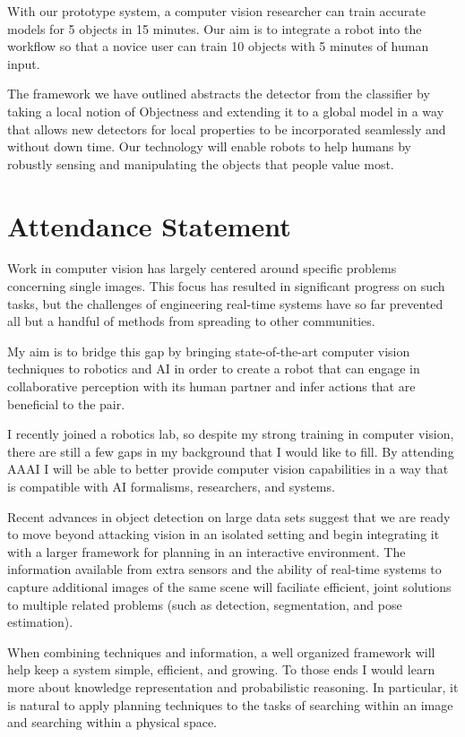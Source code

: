 \documentclass[12pt]{article}
\numberwithin{equation}{section}
\numberwithin{table}{section}
\numberwithin{figure}{section}
\begin{document}
With our prototype system, a computer vision researcher can train accurate models for 5
objects in 15 minutes. Our aim is to integrate a robot into the workflow so that a novice
user can train 10 objects with 5 minutes of human input.

The framework we have outlined abstracts the detector from the classifier by taking a local notion 
of Objectness and extending it to a global model in a way that allows new detectors 
for local properties to be incorporated seamlessly and without down time.  Our technology 
will enable robots to help humans by robustly sensing and manipulating the objects that people value most.

\newpage




\newpage

\section{Attendance Statement}
Work in computer vision has largely centered around specific problems concerning
single images. This focus has resulted in significant progress on such tasks, but the challenges of 
engineering real-time systems have so far prevented all but a handful of methods from spreading 
to other communities.  

My aim is to bridge this gap by bringing state-of-the-art computer vision techniques to
robotics and AI in order to create a robot that can engage in collaborative perception with its
human partner and infer actions that are beneficial to the pair.

I recently joined a robotics lab, so despite my strong training in computer vision,
there are still a few gaps in my background that I would like to fill.
By attending AAAI I will be able to better provide computer vision capabilities in a
way that is compatible with AI formalisms, researchers, and systems.

Recent advances in object detection on large data sets suggest that we are ready
to move beyond attacking vision in an isolated setting and begin integrating it with a
larger framework for planning in an interactive environment. The information available from
extra sensors and the ability of real-time systems to capture additional images of the same scene
will faciliate efficient, joint solutions to multiple related problems (such as detection, segmentation, and pose estimation). 

When combining techniques and information, a well organized framework will help keep a system
simple, efficient, and growing. To those ends I would learn more about knowledge representation
and probabilistic reasoning. In particular, it is natural to apply planning techniques to
the tasks of searching within an image and searching within a physical space.
\end{document}

